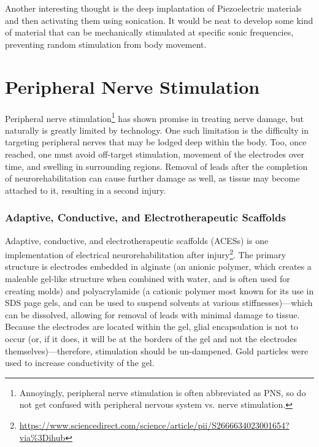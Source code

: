 \documentclass[12pt]{report}
\begin{document}
Another interesting thought is the deep implantation of Piezoelectric materials and then activating them using sonication. It would be neat to develop some kind of material that can be mechanically stimulated at specific sonic frequencies, preventing random stimulation from body movement. 


\chapter{Peripheral Nerve Stimulation} 
Peripheral nerve stimulation\footnote{Annoyingly, peripheral nerve stimulation is often abbreviated as PNS, so do not get confused with peripheral nervous system vs. nerve stimulation.} has shown promise in treating nerve damage, but naturally is greatly limited by technology. One such limitation is the difficulty in targeting peripheral nerves that may be lodged deep within the body. Too, once reached, one must avoid off-target stimulation, movement of the electrodes over time, and swelling in surrounding regions. Removal of leads after the completion of neurorehabilitation can cause further damage as well, as tissue may become attached to it, resulting in a second injury. 


\subsection{Adaptive, Conductive, and
Electrotherapeutic Scaffolds}
Adaptive, conductive, and electrotherapeutic scaffolds (ACESs) is one implementation of electrical neurorehabilitation after injury\footnote{\url{https://www.sciencedirect.com/science/article/pii/S2666634023001654?via\%3Dihub}}. The primary structure is electrodes embedded in alginate (an anionic polymer, which creates a maleable gel-like structure when combined with water, and is often used for creating molds) and polyacrylamide (a cationic polymer most known for its use in SDS page gels, and can be used to suspend solvents at various stiffnesses)---which can be dissolved, allowing for removal of leads with minimal damage to tissue. Because the electrodes are located within the gel, glial encapsulation is not to occur (or, if it does, it will be at the borders of the gel and not the electrodes themselves)---therefore, stimulation should be un-dampened. Gold particles were used to increase conductivity of the gel.\newline
\end{document}
